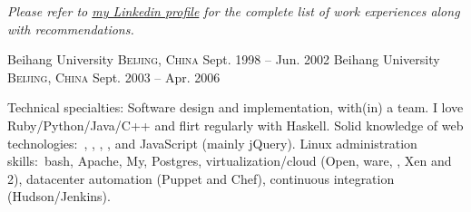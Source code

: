 \documentclass[10pt,letterpaper]{article}
\begin{document}

\begin{center}
\textit{Please refer to \href{http://www.linkedin.com/in/ciesbreijs}{my Linkedin profile} for the complete list of work experiences along with recommendations.}
\end{center}


\spacedhrule{-0.2em}{-0.4em} %



\headedsection %
{Beihang University}
{\textsc{Beijing, China}} {
 {Sept. 1998 -- Jun. 2002} {}
}
\headedsection
{Beihang University}
{\textsc{Beijing, China}} {
    {Sept. 2003 -- Apr. 2006} {}
}

\spacedhrule{0.5em}{-0.4em} %



\inlineheadsection %
{Technical specialties:}
{Software design and implementation, with(in) a team. I love Ruby/Python/Java/C++ and flirt regularly with Haskell. Solid knowledge of web technologies:\ , , , ,  and JavaScript (mainly jQuery). Linux administration skills:\ bash, Apache, My, Postgres, virtualization/cloud (Open, ware, , Xen and 2), datacenter automation (Puppet and Chef), continuous integration (Hudson/Jenkins).}

\end{document}
